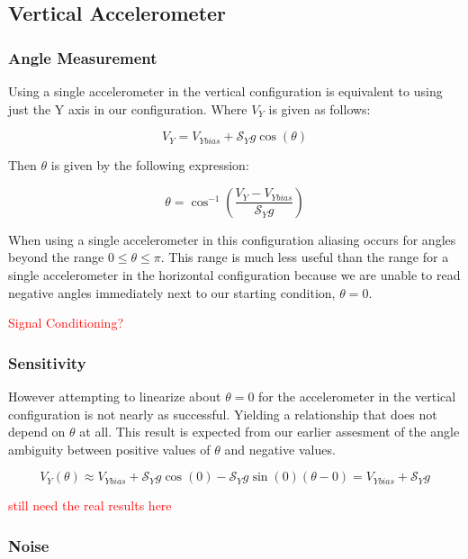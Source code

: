 \documentclass{article}
\newcommand{\xxx}[1]{\textcolor{red}{#1}}
\theoremstyle{plain}
\theoremstyle{definition}
\theoremstyle{remark}
\newcommand{\Sens}{\mathcal{S}}
\begin{document}
\subsection{Vertical Accelerometer}

\subsubsection{Angle Measurement}

Using a single accelerometer in the vertical configuration is equivalent to using just the Y axis in our configuration.  Where $V_{Y}$ is given as follows:

$$ V_{Y} = V_{Ybias} + \Sens_{Y} g \cos(\theta) $$

Then $\theta$ is given by the following expression:

\begin{equation}
\theta = \cos^{-1}\left( \frac{V_{Y} - V_{Ybias}}{\Sens_{Y} g}\right)
\label{verticalEQ}
\end{equation}

When using a single accelerometer in this configuration aliasing occurs for angles beyond the range $0 \leq \theta \leq \pi$.  This range is much less useful than the range for a single accelerometer in the horizontal configuration because we are unable to read negative angles immediately next to our starting condition, $\theta = 0$. 

\xxx{Signal Conditioning?}

\subsubsection{Sensitivity}

However attempting to linearize about $\theta = 0$ for the accelerometer in the vertical configuration is not nearly as successful.  Yielding a relationship that does not depend on $\theta$ at all.  This result is expected from our earlier assesment of the angle ambiguity between positive values of $\theta$ and negative values.  

$$V_{Y}(\theta) \approx V_{Ybias} + \Sens_{Y} g \cos(0) - \Sens_{Y} g \sin(0) (\theta - 0) = V_{Ybias} + \Sens_{Y} g $$

\xxx{still need the real results here}

\subsubsection{Noise}
\end{document}
